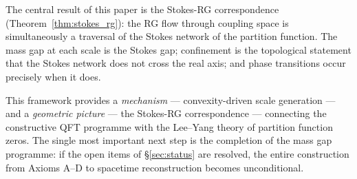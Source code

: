 \documentclass[12pt]{article}
\theoremstyle{definition}
\theoremstyle{remark}
\begin{document}
The central result of this paper is the Stokes-RG correspondence
(Theorem~\ref{thm:stokes_rg}): the RG flow through coupling space
is simultaneously a traversal of the Stokes network of the partition
function.  The mass gap at each scale is the Stokes gap; confinement
is the topological statement that the Stokes network does not cross
the real axis; and phase transitions occur precisely when it does.

This framework provides a \emph{mechanism} --- convexity-driven
scale generation --- and a \emph{geometric picture} ---
the Stokes-RG correspondence --- connecting the constructive QFT
programme with the Lee--Yang theory of partition function zeros.
The single most important next step is the completion of the mass
gap programme: if the open items of \S\ref{sec:status} are resolved,
the entire construction from Axioms A--D to spacetime reconstruction
becomes unconditional.
\end{document}
